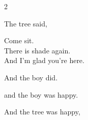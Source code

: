 \begin{center}
\begin{minipage}{0.85\textwidth}
\begin{multicols}{2}
{\large The tree said,\\
\vspace{0.5em}

\QENOpen{}Come sit.\\
There is shade again.\\
And I'm glad you're here.\QENClose{}}

{\large And the boy did.\\
\vspace{0.5em}

and the boy was happy.}

\vspace{1.5em}

{\large And the tree was happy,
}

\vspace{0.5em}
\end{multicols}
\end{minipage}
\end{center}
\vfill

